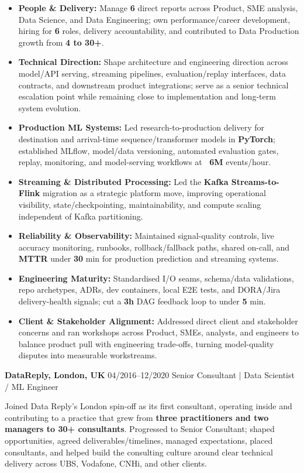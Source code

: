 \documentclass[]{../../../../friggeri-cv}
\renewcommand{\entry}[4]{%
  \parbox[t]{\dimexpr\textwidth-\entryleftinset\relax}{%
    \textbf{#2}%
    {\footnotesize\addfontfeature{Color=lightgray}\hspace{0.6em}#1}%
    \hfill%
    {\small\color{textcolor} #3}\\%
    #4\vspace{\parsep}%
  }\\}
\begin{document}
\begin{entrylist}
{{        }
        \begin{itemize}[leftmargin=1.1em]
            \item \footnotesize\textbf{People \& Delivery:} Manage \textbf{6} direct reports across Product, SME analysis, Data Science, and Data Engineering; own performance/career development, hiring for \textbf{6} roles, delivery accountability, and contributed to Data Production growth from \textbf{4 to 30+}.
            \item \footnotesize\textbf{Technical Direction:} Shape architecture and engineering direction across model/API serving, streaming pipelines, evaluation/replay interfaces, data contracts, and downstream product integrations; serve as a senior technical escalation point while remaining close to implementation and long-term system evolution.
            \item \footnotesize\textbf{Production ML Systems:} Led research-to-production delivery for destination and arrival-time sequence/transformer models in \textbf{PyTorch}; established MLflow, model/data versioning, automated evaluation gates, replay, monitoring, and model-serving workflows at \textbf{~6M} events/hour.
            \item \footnotesize\textbf{Streaming \& Distributed Processing:} Led the \textbf{Kafka Streams-to-Flink} migration as a strategic platform move, improving operational visibility, state/checkpointing, maintainability, and compute scaling independent of Kafka partitioning.
            \item \footnotesize\textbf{Reliability \& Observability:} Maintained signal-quality controls, live accuracy monitoring, runbooks, rollback/fallback paths, shared on-call, and \textbf{MTTR} under \textbf{30} min for production prediction and streaming systems.
            \item \footnotesize\textbf{Engineering Maturity:} Standardised I/O seams, schema/data validations, repo archetypes, ADRs, dev containers, local E2E tests, and DORA/Jira delivery-health signals; cut a \textbf{3h} DAG feedback loop to under \textbf{5} min.
            \item \footnotesize\textbf{Client \& Stakeholder Alignment:} Addressed direct client and stakeholder concerns and ran workshops across Product, SMEs, analysts, and engineers to balance product pull with engineering trade-offs, turning model-quality disputes into measurable workstreams.
        \end{itemize}
    }
    \entry
    {04/2016--12/2020}
    {DataReply, London, UK}
    {Senior Consultant | Data Scientist / ML Engineer}
    {
        {\small
        \setlength{\parindent}{0pt}
        \setlength{\leftskip}{0pt}
        Joined Data Reply's London spin-off as its first consultant, operating inside and contributing to a practice that grew from \textbf{three practitioners and two managers to 30+ consultants}. Progressed to Senior Consultant; shaped opportunities, agreed deliverables/timelines, managed expectations, placed consultants, and helped build the consulting culture around clear technical delivery across UBS, Vodafone, CNHi, and other clients.

}}
\end{entrylist}
\end{document}
